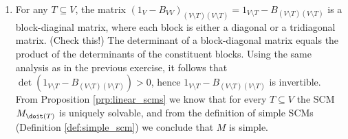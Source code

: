 \begin{enumerate}
\begin{gradedsolution}
\begin{enumerate}
		\begin{align*}
			&1_V-B_{VV}\\
			&=\begin{pmatrix}
				1 & -k_1/(k_1+k_0) & 0 & 0 & ... \\
				-k_1 / (k_2+k_1) & 1 & -k_2 / (k_2+k_1) & 0 & ... \\
				0& -k_2 / (k_3+k_2) & 1 & -k_3 / (k_3+k_2) & ... \\
				... & ... & ... & ... & ... 
			\end{pmatrix}\\
			&=\begin{pmatrix}
				1/(k_1+k_0) & 0 & 0 & 0 & ... \\
				0& 1/ (k_2+k_1) &  & 0 & ... \\
				0& 0& 1 / (k_3+k_2) &0& ... \\
				... & ... & ... & ... & ... 
			\end{pmatrix}
			\begin{pmatrix}
				k_0+k_1 & -k_1       &     0     &    \dots     \\
				-k_1     & k_1 + k_2 & -k_2       &  \dots        \\
				0		& -k_2       & k_2 + k_3 &  \dots \\
				\dots	&   \dots        & \dots   & \dots  
			\end{pmatrix}
		\end{align*}
		The determinant of the first matrix is the product of the diagonals, the second is the given by the hint, so
		\begin{align*}
			\det (1_V - B_{VV}) = \left(\prod_{i=1}^d \frac{1}{k_{i-1}+k_i}\right)\left(\sum_{i=0}\prod_{\substack{j = 0\\j\neq i}}^d k_j\right)
		\end{align*}
		which is clearly positive for positive $k_i$.
		
		\item For any $T \subseteq V$, the matrix $(1_{V}-B_{VV})_{(V \setminus T)(V \setminus T)} = 1_{V \setminus T}-B_{(V \setminus T)(V \setminus T)}$ is a block-diaginal matrix, where each block is either a diagonal or a tridiagonal matrix. (Check this!) The determinant of a block-diagonal matrix equals the product of the determinants of the constituent blocks. Using the same analysis as in the previous exercise, it follows that $\det(1_{V \setminus T}-B_{(V \setminus T)(V \setminus T)}) > 0$, hence $1_{V \setminus T}-B_{(V \setminus T)(V \setminus T)}$ is invertible. From Proposition \ref*{prp:linear_scms} we know that for every $T\subseteq V$ the SCM $M_{\doit (T)}$ is uniquely solvable, and from the definition of simple SCMs (Definition \ref*{def:simple_scm}) we conclude that $M$ is simple.
	\end{enumerate}
\end{gradedsolution}
	

\end{enumerate}

